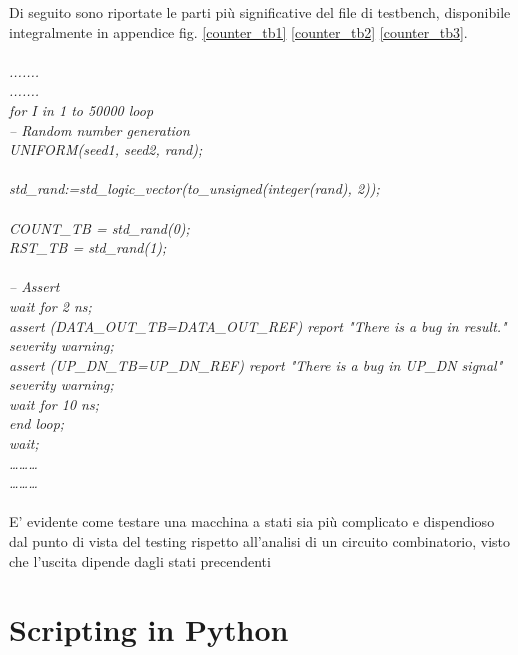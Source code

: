 Di seguito sono riportate le parti più significative del file di testbench, disponibile integralmente in appendice fig. \ref{counter_tb1} \ref{counter_tb2} \ref{counter_tb3}.\\
\\
\textit{.......\\
.......\\
for I in 1 to 50000 loop\\
-- Random number generation\\
UNIFORM(seed1, seed2, rand);\\
\\
std\_rand:=std\_logic\_vector(to\_unsigned(integer(rand), 2));\\
\\
COUNT\_TB \<= std\_rand(0);\\
RST\_TB \<= std\_rand(1); \\
\\
-- Assert\\
wait for 2 ns;\\
assert (DATA\_OUT\_TB=DATA\_OUT\_REF) report "There is a bug in result." severity warning;\\
assert (UP\_DN\_TB=UP\_DN\_REF) report "There is a bug in UP\_DN signal" severity warning;\\
wait for 10 ns;\\
end loop;\\
wait;\\
………\\
………}\\
\\
E' evidente come testare una macchina a stati sia più complicato e dispendioso dal punto di vista del testing rispetto all'analisi di un circuito combinatorio, visto che l'uscita dipende dagli stati precendenti\\ 
\section{Scripting in Python}
